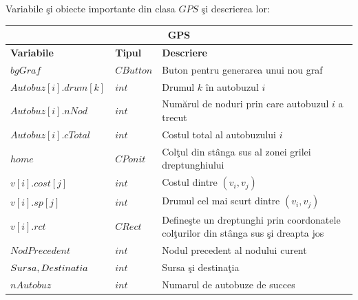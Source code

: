 \documentclass[11pt,a4paper]{report}
\begin{document}
        Variabile \c si obiecte importante din clasa $GPS$ \c si descrierea lor:
     \begin{center}
     	\begin{tabular}{ |p{3.1cm}|p{2cm}|p{6.1cm}|  }
    		
     		\hline
     		\multicolumn{3}{|c|}{\textbf{GPS}} \\
     		\hline
     		
     		\textbf{Variabile} & \textbf{Tipul} & \textbf{Descriere}\\
     		\hline
     		
     		$bgGraf$        & $CButton$   & Buton pentru generarea unui nou graf\vspace{0.1cm}  \\
     		\hline
     		$Autobuz[i].drum[k]$ & $int$       & Drumul $k$ \^ in autobuzul $i$\vspace{0.1cm} \\
     		\hline
     		$Autobuz[i].nNod$  & $int$       & Num\u arul de noduri prin care autobuzul $i$ a trecut \vspace{0.1cm}\\
     		\hline
     		$Autobuz[i].cTotal$      & $int$       & Costul total al autobuzului $i$\vspace{0.1cm}\\
     		\hline
     		$home$           & $CPonit$    & Col\c tul din st\^ anga sus al zonei grilei dreptunghiului \vspace{0.1cm}   \\
     		\hline
     		$v[i].cost[j]$     & $int$       & Costul dintre $(v_{i}, v_{j})$\vspace{0.1cm}\\
     		\hline
     		$v[i].sp[j]$     & $int$       & Drumul cel mai scurt dintre $(v_{i}, v_{j})$\vspace{0.1cm}\\
     		\hline
     		$v[i].rct$     & $CRect$       & Define\c ste un dreptunghi prin coordonatele col\c turilor din st\^ anga sus \c si dreapta jos\\
     		\hline
     		$NodPrecedent$             & $int$       & Nodul precedent al nodului curent\vspace{0.1cm}\\
     		\hline
     		$Sursa, \newline Destinatia$         & $int$       & Sursa \c si destina\c tia\vspace{0.1cm}\\
     		\hline
     		$nAutobuz$           & $int$       & Numarul de autobuze de succes\vspace{0.1cm}\\

\end{tabular}
\end{center}
\end{document}
